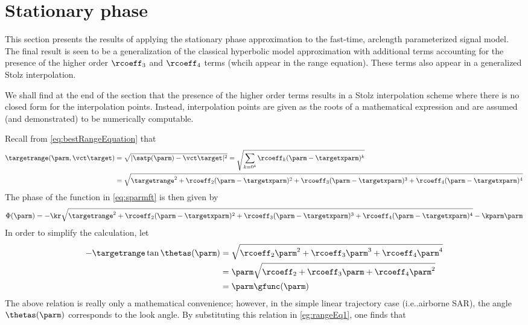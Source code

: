 \section{Stationary phase}
This section presents the results of applying the stationary phase approximation to the fast-time, arclength parameterized signal model. The final result is seen to be a generalization of the classical hyperbolic model approximation with additional terms accounting for the presence of the higher order $\rcoeff_3$ and $\rcoeff_4$ terms (whcih appear in the range equation). These terms also appear in a generalized Stolz interpolation. 
\par
We shall find at the end of the section that the presence of the higher order terms results in a Stolz interpolation scheme where there is no closed form for the interpolation points. Instead, interpolation points are given as the roots of a mathematical expression and are assumed (and demonstrated) to be numerically computable.
\par
Recall from \eqref{eq:bestRangeEquation} that
\begin{equation}
\begin{split}
\targetrange(\parm, \vct\target) &= \sqrt{\lvert\satp(\parm)-\vct\target\rvert^2} = \sqrt{\sum_{k=0^4}\rcoeff_k(\parm-\targetxparm)^k}\\
&=\sqrt{\targetrange^2 + \rcoeff_2(\parm-\targetxparm)^2 + \rcoeff_3(\parm-\targetxparm)^3 + \rcoeff_4(\parm-\targetxparm)^4}
\end{split}
\end{equation}
The phase of the function in \eqref{eq:sparmft} is then given by
\begin{equation}
 \Phi(\parm) = -\kr\sqrt{\targetrange^2 + \rcoeff_2(\parm-\targetxparm)^2 + \rcoeff_3(\parm-\targetxparm)^3 + \rcoeff_4(\parm-\targetxparm)^4} - \kparm\parm
 \label{eg:rangeEq1}
\end{equation}
In order to simplify the calculation, let
\begin{equation}
\begin{split}
 -\targetrange\tan\thetas(\parm) &= \sqrt{\rcoeff_2\parm^2 + \rcoeff_3\parm^3 + \rcoeff_4\parm^4}\\
 &=\parm\sqrt{\rcoeff_2 + \rcoeff_3\parm + \rcoeff_4\parm^2}\\
 &=\parm\gfunc(\parm)
\end{split}
\label{eq:gfunc}
\end{equation}
The above relation is really only a mathematical convenience; however, in the simple linear trajectory case (i.e..airborne SAR), the angle $\thetas(\parm)$ corresponds to the look angle. By substituting this relation in \eqref{eg:rangeEq1}, one finds that
